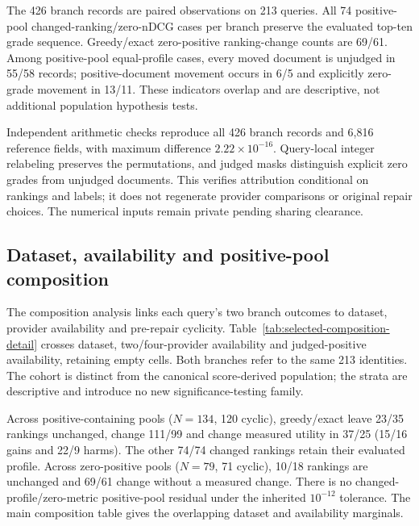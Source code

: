 \documentclass[pdflatex,sn-basic,Numbered]{sn-jnl}
\begin{document}
The 426 branch records are paired observations on 213 queries. All 74 positive-pool changed-ranking/zero-nDCG cases per branch preserve the evaluated top-ten grade sequence. Greedy/exact zero-positive ranking-change counts are 69/61. Among positive-pool equal-profile cases, every moved document is unjudged in 55/58 records; positive-document movement occurs in 6/5 and explicitly zero-grade movement in 13/11. These indicators overlap and are descriptive, not additional population hypothesis tests.

Independent arithmetic checks reproduce all 426 branch records and 6,816 reference fields, with maximum difference $2.22\times10^{-16}$. Query-local integer relabeling preserves the permutations, and judged masks distinguish explicit zero grades from unjudged documents. This verifies attribution conditional on rankings and labels; it does not regenerate provider comparisons or original repair choices. The numerical inputs remain private pending sharing clearance.

\subsection{Dataset, availability and positive-pool composition}
The composition analysis links each query's two branch outcomes to dataset, provider availability and pre-repair cyclicity. Table~\ref{tab:selected-composition-detail} crosses dataset, two/four-provider availability and judged-positive availability, retaining empty cells. Both branches refer to the same 213 identities. The cohort is distinct from the canonical score-derived population; the strata are descriptive and introduce no new significance-testing family.

Across positive-containing pools ($N=134$, 120 cyclic), greedy/exact leave 23/35 rankings unchanged, change 111/99 and change measured utility in 37/25 (15/16 gains and 22/9 harms). The other 74/74 changed rankings retain their evaluated profile. Across zero-positive pools ($N=79$, 71 cyclic), 10/18 rankings are unchanged and 69/61 change without a measured change. There is no changed-profile/zero-metric positive-pool residual under the inherited $10^{-12}$ tolerance. The main composition table gives the overlapping dataset and availability marginals.
\end{document}
